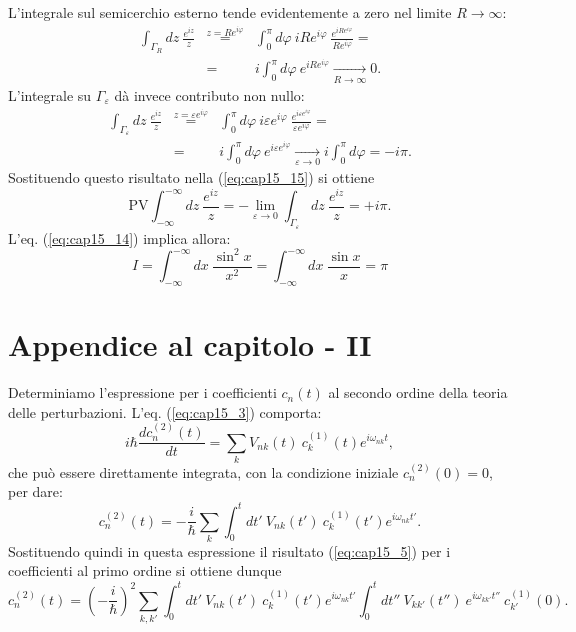 L'integrale sul semicerchio esterno tende evidentemente a zero nel limite $R\rightarrow \infty $:
\begin{eqnarray}
\int _{\Gamma _{R}} dz\ \frac{e^{iz}}{z} &\overset{z= Re^{i\varphi}}{=}& \int _0 ^{\pi} d\varphi \ i R e^{i\varphi}\ \frac{e^{iRe^{i\varphi}}}{Re^{i\varphi}} = \nonumber\\
&=&i\int _0 ^{\pi} d\varphi \ e^{iRe^{i\varphi}} \underset{R\rightarrow \infty}{\longrightarrow}0.
\end{eqnarray}
L'integrale su $\Gamma _{\varepsilon}$ dà invece contributo non nullo:
\begin{eqnarray}
\int _{\Gamma _{\varepsilon}} dz\ \frac{e^{iz}}{z} &\overset{z= \varepsilon e^{i\varphi}}{=} &\int _0 ^{\pi} d\varphi \ i \varepsilon e^{i\varphi}\ \frac{e^{i\varepsilon e^{i\varphi}}}{\varepsilon e^{i\varphi}} = \nonumber\\
&=&i\int _0 ^{\pi} d\varphi \ e^{i\varepsilon e^{i\varphi}} \underset{\varepsilon\rightarrow 0}{\longrightarrow}i\int _0 ^{\pi} d\varphi = -i\pi.
\end{eqnarray}
Sostituendo questo risultato nella (\ref{eq:cap15_15}) si ottiene
\begin{equation}
\textrm{PV} \int _{-\infty} ^{-\infty} dz\ \frac{e^{iz}}{z} =-\lim _{\varepsilon \rightarrow 0} \int _{\Gamma _{\varepsilon}} dz\ \frac{e^{iz}}{z}= +i\pi.
\end{equation}
L'eq. (\ref{eq:cap15_14}) implica allora:
\begin{equation}
I= \int _{-\infty} ^{-\infty} dx\ \frac{\sin ^2  x}{x^2}= \int _{-\infty} ^{-\infty} dx\ \frac{\sin  x}{x}= \pi
\end{equation}
\newpage
\section*{Appendice al capitolo - II}
Determiniamo l'espressione per i coefficienti $c_n(t)$ al secondo ordine della teoria delle perturbazioni. L'eq. (\ref{eq:cap15_3}) comporta:
\begin{equation}
i\hbar \frac{dc_n ^{(2)} (t)}{dt} = \sum _k V_{nk} (t)\ c_k ^{(1)}(t) e^{i\omega _{nk}t},
\end{equation}
che può essere direttamente integrata, con la condizione iniziale $c_n ^{(2)} (0)=0 $, per dare:
\begin{equation}
c_n ^{(2)} (t)= -\frac{i}{\hbar}\sum _k \int _0 ^t dt'\ V_{nk} (t')\ c_k ^{(1)} (t') e ^{i\omega _{nk} t'}.
\end{equation}
Sostituendo quindi in questa espressione il risultato (\ref{eq:cap15_5}) per i coefficienti al primo ordine si ottiene dunque
\begin{equation}
c_n ^{(2)} (t)= \left(-\frac{i}{\hbar}\right)^2 \sum _{k,k'} \int _0 ^t dt'\ V_{nk} (t')\ c_k ^{(1)} (t') e ^{i\omega _{nk} t'}\int _0 ^t dt''\ V_{kk'} (t'')\  e ^{i\omega _{kk'} t''}\ c_{k'} ^{(1)} (0).
\end{equation}